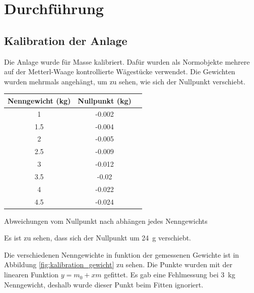 \section{Durchf\"uhrung}


\subsection{Kalibration der Anlage}

Die Anlage wurde f\"ur Masse kalibriert. Daf\"ur wurden als  Normobjekte mehrere
auf  der  Metterl-Waage  kontrollierte W\"agest\"ucke verwendet.  Die  Gewichten
wurden mehrmals angeh\"angt,  um  zu  sehen,  wie sich der Nullpunkt verschiebt.

\begin{center}
    \begin{threeparttable}
        \begin{tabular}{ccc}
            \toprule
            Nenngewicht (kg) & Nullpunkt (kg) \\
            \midrule
            1   & -0.002 \\
            1.5 & -0.004 \\
            2   & -0.005 \\
            2.5 & -0.009 \\
            3   & -0.012 \\
            3.5 & -0.02  \\
            4   & -0.022 \\
            4.5 & -0.024 \\
            \bottomrule
        \end{tabular}
        \caption{Abweichungen vom Nullpunkt nach abh\"angen jedes Nenngewichts}
    \end{threeparttable}
\end{center}

Es ist zu sehen, dass sich der Nullpunkt um \SI{24}{\gram} verschiebt.

Die  verschiedenen  Nenngewichte in funktion  der  gemessenen  Gewichte  ist  in
Abbildung  \ref{fig:kalibration_gewicht} zu sehen. Die  Punkte  wurden  mit  der
linearen   Funktion  $y=m_0+xm$  gefittet.   Es   gab   eine   Fehlmessung   bei
\SI{3}{\kilo\gram}  Nenngewicht,  deshalb  wurde   dieser   Punkt   beim  Fitten
ignoriert.


